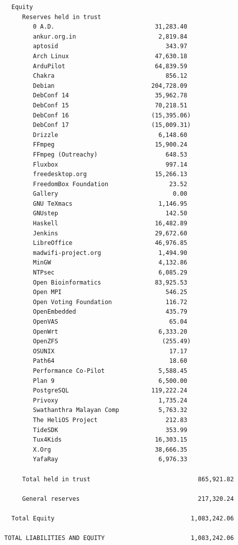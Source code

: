 \documentclass[a4paper]{report}
\begin{document}
\begin{verbatim}
     Equity
        Reserves held in trust
           0 A.D.                            31,283.40
           ankur.org.in                       2,819.84
           aptosid                              343.97
           Arch Linux                        47,630.18
           ArduPilot                         64,839.59
           Chakra                               856.12
           Debian                           204,728.09
           DebConf 14                        35,962.78
           DebConf 15                        70,218.51
           DebConf 16                       (15,395.06)
           DebConf 17                       (15,009.31)
           Drizzle                            6,148.60
           FFmpeg                            15,900.24
           FFmpeg (Outreachy)                   648.53
           Fluxbox                              997.14
           freedesktop.org                   15,266.13
           FreedomBox Foundation                 23.52
           Gallery                                0.00
           GNU TeXmacs                        1,146.95
           GNUstep                              142.50
           Haskell                           16,482.89
           Jenkins                           29,672.60
           LibreOffice                       46,976.85
           madwifi-project.org                1,494.90
           MinGW                              4,132.86
           NTPsec                             6,085.29
           Open Bioinformatics               83,925.53
           Open MPI                             546.25
           Open Voting Foundation               116.72
           OpenEmbedded                         435.79
           OpenVAS                               65.04
           OpenWrt                            6,333.20
           OpenZFS                             (255.49)
           OSUNIX                                17.17
           Path64                                18.60
           Performance Co-Pilot               5,588.45
           Plan 9                             6,500.00
           PostgreSQL                       119,222.24
           Privoxy                            1,735.24
           Swathanthra Malayan Comp           5,763.32
           The HeliOS Project                   212.83
           TideSDK                              353.99
           Tux4Kids                          16,303.15
           X.Org                             38,666.35
           YafaRay                            6,976.33

        Total held in trust                              865,921.82

        General reserves                                 217,320.24

     Total Equity                                      1,083,242.06

   TOTAL LIABILITIES AND EQUITY                        1,083,242.06
\end{verbatim}
\end{document}
